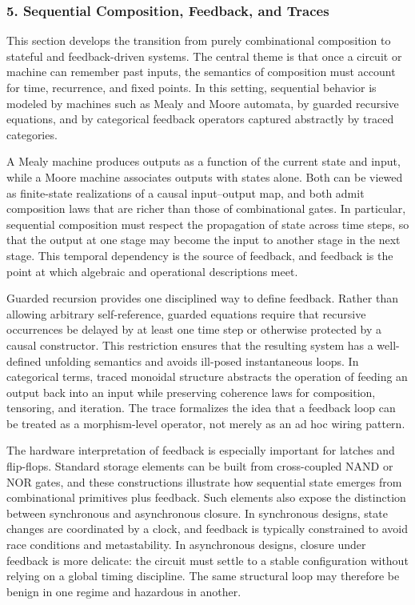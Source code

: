\documentclass[11pt]{article}
\begin{document}

\subsubsection{5. Sequential Composition, Feedback, and Traces}


This section develops the transition from purely combinational composition to stateful and feedback-driven systems. The central theme is that once a circuit or machine can remember past inputs, the semantics of composition must account for time, recurrence, and fixed points. In this setting, sequential behavior is modeled by machines such as Mealy and Moore automata, by guarded recursive equations, and by categorical feedback operators captured abstractly by traced categories.

A Mealy machine produces outputs as a function of the current state and input, while a Moore machine associates outputs with states alone. Both can be viewed as finite-state realizations of a causal input--output map, and both admit composition laws that are richer than those of combinational gates. In particular, sequential composition must respect the propagation of state across time steps, so that the output at one stage may become the input to another stage in the next stage. This temporal dependency is the source of feedback, and feedback is the point at which algebraic and operational descriptions meet.

Guarded recursion provides one disciplined way to define feedback. Rather than allowing arbitrary self-reference, guarded equations require that recursive occurrences be delayed by at least one time step or otherwise protected by a causal constructor. This restriction ensures that the resulting system has a well-defined unfolding semantics and avoids ill-posed instantaneous loops. In categorical terms, traced monoidal structure abstracts the operation of feeding an output back into an input while preserving coherence laws for composition, tensoring, and iteration. The trace formalizes the idea that a feedback loop can be treated as a morphism-level operator, not merely as an ad hoc wiring pattern.

The hardware interpretation of feedback is especially important for latches and flip-flops. Standard storage elements can be built from cross-coupled NAND or NOR gates, and these constructions illustrate how sequential state emerges from combinational primitives plus feedback. Such elements also expose the distinction between synchronous and asynchronous closure. In synchronous designs, state changes are coordinated by a clock, and feedback is typically constrained to avoid race conditions and metastability. In asynchronous designs, closure under feedback is more delicate: the circuit must settle to a stable configuration without relying on a global timing discipline. The same structural loop may therefore be benign in one regime and hazardous in another.
\end{document}
